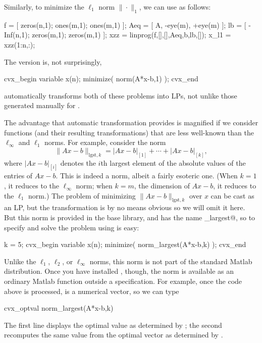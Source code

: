 \documentclass[12pt]{article}
\begin{document}
Similarly, to minimize the $\ell_1$ norm $\|\cdot\|_1$, we can
use \verb@linprog@ as follows:
\begin{code2}[firstnumber=139]
	f    = [ zeros(n,1); ones(m,1);  ones(m,1)  ];
	Aeq  = [ A,          -eye(m),    +eye(m)    ];
	lb   = [ -Inf(n,1);  zeros(m,1); zeros(m,1) ];
	xzz  = linprog(f,[],[],Aeq,b,lb,[]);
	x_l1 = xzz(1:n,:);
\end{code2}
The \cvx version is, not surprisingly,
\begin{code2}[firstnumber=149]
	cvx_begin
	    variable x(n);
	    minimize( norm(A*x-b,1) );
	cvx_end
\end{code2}
\cvx automatically transforms both of these problems into LPs, not unlike
those generated manually for \verb@linprog@.

The advantage that automatic transformation provides
is magnified if we consider
functions (and their resulting transformations) that are less well-known than 
the $\ell_\infty$ and $\ell_1$ norms. For example, consider
the norm
\[
\| Ax-b\|_{\mathrm{lgst},k} = |Ax-b|_{[1]}+ \cdots + |Ax-b|_{[k]},
\]
where $|Ax-b|_{[i]}$ denotes the $i$th largest element of the absolute
values of the entries of $Ax-b$.
This is indeed a norm, albeit a fairly esoteric one.
(When $k=1$, it reduces to the $\ell_\infty$ norm;
when $k=m$, the dimension of $Ax-b$, it reduces to the $\ell_1$ norm.)
The problem of minimizing $\| Ax-b\|_{\mathrm{lgst},k}$ over $x$
can be cast as an LP, but the transformation is by no means obvious
so we will omit it here.
But this norm is provided in the base \cvx library, and has the name
\verb@norm_largest@, so to specify and solve
the problem using \cvx is easy:
\begin{code2}[firstnumber=179]
	k = 5;
	cvx_begin
	    variable x(n);
	    minimize( norm_largest(A*x-b,k) );
	cvx_end
\end{code2}
Unlike the $\ell_1$, $\ell_2$, or $\ell_\infty$ norms,
this norm is not part of the standard Matlab distribution.
Once you have installed \cvx, though, the norm is available as 
an ordinary Matlab function outside a \cvx specification.
For example, once the code above is processed, \verb@x@ is
a numerical vector, so we can type
\begin{code}
	cvx_optval
	norm_largest(A*x-b,k)
\end{code}
The first line displays the optimal value as determined by \cvx;
the second recomputes the same value from the optimal
vector \verb@x@ as determined by \cvx.
\end{document}
